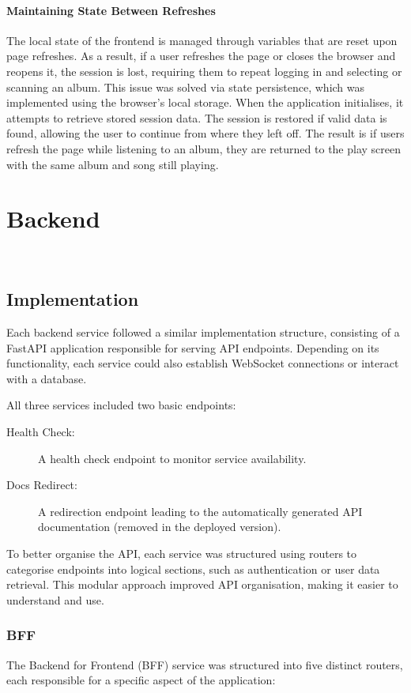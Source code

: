 \paragraph{Maintaining State Between Refreshes}
The local state of the frontend is managed through variables that are reset upon page refreshes. As a result, if a user refreshes the page or closes the browser and reopens it, the session is lost, requiring them to repeat logging in and selecting or scanning an album. This issue was solved via state persistence, which was implemented using the browser's local storage. When the application initialises, it attempts to retrieve stored session data. The session is restored if valid data is found, allowing the user to continue from where they left off. The result is if users refresh the page while listening to an album, they are returned to the play screen with the same album and song still playing.

\section{Backend}~\label{sec:backend-development}
\subsection{Implementation}
Each backend service followed a similar implementation structure, consisting of a FastAPI application responsible for serving API endpoints. Depending on its functionality, each service could also establish WebSocket connections or interact with a database.

All three services included two basic endpoints:
\begin{description}
    \item[Health Check:] A health check endpoint to monitor service availability.
    \item[Docs Redirect:] A redirection endpoint leading to the automatically generated API documentation (removed in the deployed version).
\end{description}

To better organise the API, each service was structured using routers to categorise endpoints into logical sections, such as authentication or user data retrieval. This modular approach improved API organisation, making it easier to understand and use.

\subsubsection{BFF}
The Backend for Frontend (BFF) service was structured into five distinct routers, each responsible for a specific aspect of the application:

